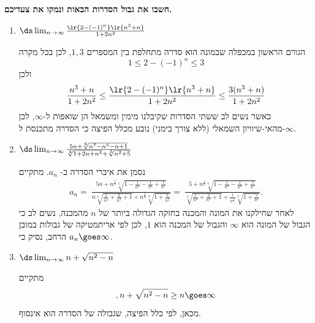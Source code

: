 \textbf{חשבו את גבול הסדרות הבאות ונמקו את צעדיכם.}
\begin{enumerate}
\item $\ds\lim_{n \to \infty} \frac{\lr{2 - (-1)^n}\lr{n^3 + n}}{1 + 2n^2}$
\begin{solbox}
    הגורם הראשון במכפלה שבמונה הוא סדרה מתחלפת בין המספרים
    $1,3$,
    לכן בכל מקרה
    $$1\le 2-(-1)^n\le 3$$
    ולכן
    $$\frac{n^3+n}{1+2n^2}\le\frac{\lr{2 - (-1)^n}\lr{n^3 + n}}{1 + 2n^2}\le
    \frac{3(n^3+n)}{1+2n^2}$$
    כאשר נשים לב ששתי הסדרות שקיבלנו מימין ומשמאל הן שואפות ל-$\infty$, לכן מהאי-שיוויון השמאלי (ללא צורך בימני) נובע מכלל הפיצה כי הסדרה מתכנסת ל-$\infty$.
\end{solbox}

\item $\ds\lim_{n \to \infty} \frac{5n + \sqrt[6]{n^7 - n^5 - n + 1}}{\sqrt[4]{1 + 2n + n^4} + \sqrt[3]{n^2 + 5}}$
\begin{solbox}
נסמן את איברי הסדרה ב-
$a_n$.
מתקיים
\begin{align*}
a_n
=\ \frac{5n + n^{\frac{7}{6}}\sqrt[6]{1 - \frac{1}{n^2} - \frac{1}{n^6} + \frac{1}{n^7}}}{n \sqrt[4]{\frac{1}{n^4} + \frac{2}{n^3} + 1} + n^{\frac{2}{3}}\sqrt[3]{1 + \frac{5}{n^2}}}
=\ \frac{5 + n^{\frac{1}{6}}\sqrt[6]{1 - \frac{1}{n^2} - \frac{1}{n^6} + \frac{1}{n^7}}}{\sqrt[4]{\frac{1}{n^4} + \frac{2}{n^3} + 1} + \frac{1}{n^{\frac{1}{3}}}\sqrt[3]{1 + \frac{5}{n^2}}}.
\end{align*}
לאחר שחילקנו את המונה והמכנה בחזקה הגדולה ביותר של
$n$
מהמכנה,
נשים לב כי הגבול של המונה הוא
$\infty$
והגבול של המכנה הוא
$1$,
לכן
לפי אריתמטיקה של גבולות במובן הרחב, נסיק כי
$a_n\goes\infty$.
\end{solbox}
\item $\ds\lim_{n \to \infty} n + \sqrt{n^2 - n}$
\begin{solbox}
מתקיים
$$,n + \sqrt{n^2 - n}\geq n \goes\infty$$
מכאן, לפי כלל הפיצה, שגבולה של הסדרה הוא אינסוף.
\end{solbox}
\eMs
\end{enumerate}
